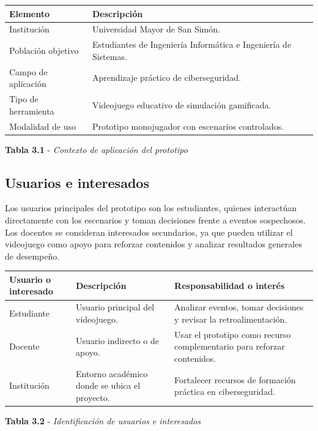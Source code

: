 \begin{center}

\vspace{0.2cm}
\begin{tabular}{|p{}|p{}|}
\hline
\textbf{Elemento} & \textbf{Descripci\'{o}n} \\
\hline
Instituci\'{o}n & Universidad Mayor de San Sim\'{o}n. \\
\hline
Poblaci\'{o}n objetivo & Estudiantes de Ingenier\'{i}a Inform\'{a}tica e Ingenier\'{i}a de Sistemas. \\
\hline
Campo de aplicaci\'{o}n & Aprendizaje pr\'{a}ctico de ciberseguridad. \\
\hline
Tipo de herramienta & Videojuego educativo de simulaci\'{o}n gamificada. \\
\hline
Modalidad de uso & Prototipo monojugador con escenarios controlados. \\
\hline
\end{tabular}

\textbf{Tabla 3.1} - \textit{Contexto de aplicaci\'{o}n del prototipo}

\end{center}

\subsection{Usuarios e interesados}

Los usuarios principales del prototipo son los estudiantes, quienes interact\'{u}an directamente con los escenarios y toman decisiones frente a eventos sospechosos. Los docentes se consideran interesados secundarios, ya que pueden utilizar el videojuego como apoyo para reforzar contenidos y analizar resultados generales de desempe\~{n}o.

\begin{center}

\vspace{0.2cm}
\begin{tabular}{|p{}|p{}|p{}|}
\hline
\textbf{Usuario o interesado} & \textbf{Descripci\'{o}n} & \textbf{Responsabilidad o inter\'{e}s} \\
\hline
Estudiante & Usuario principal del videojuego. & Analizar eventos, tomar decisiones y revisar la retroalimentaci\'{o}n. \\
\hline
Docente & Usuario indirecto o de apoyo. & Usar el prototipo como recurso complementario para reforzar contenidos. \\
\hline
Instituci\'{o}n & Entorno acad\'{e}mico donde se ubica el proyecto. & Fortalecer recursos de formaci\'{o}n pr\'{a}ctica en ciberseguridad. \\
\hline
\end{tabular}

\textbf{Tabla 3.2} - \textit{Identificaci\'{o}n de usuarios e interesados}


\end{center}

